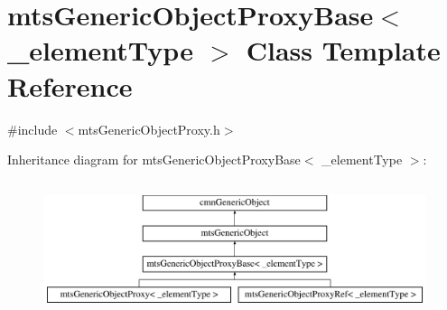 \hypertarget{classmts_generic_object_proxy_base}{\section{mts\-Generic\-Object\-Proxy\-Base$<$ \-\_\-element\-Type $>$ Class Template Reference}
\label{classmts_generic_object_proxy_base}
}


{\ttfamily \#include $<$mts\-Generic\-Object\-Proxy.\-h$>$}

Inheritance diagram for mts\-Generic\-Object\-Proxy\-Base$<$ \-\_\-element\-Type $>$\-:\begin{figure}[H]
\begin{center}
\leavevmode
\includegraphics[height=3.957597cm]{da/d84/classmts_generic_object_proxy_base}
\end{center}
\end{figure}
